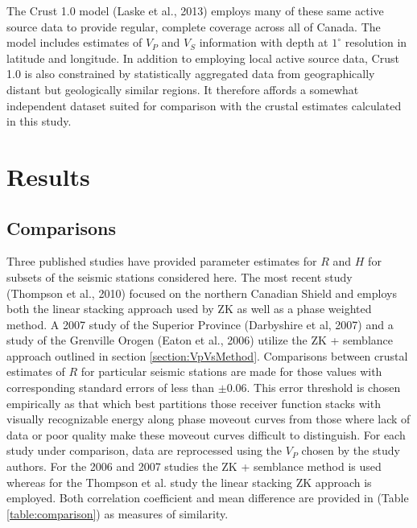 \documentclass[review]{elsarticle}
\begin{document}
The Crust 1.0 model (Laske et al., 2013) employs many of these same active source data to provide regular, complete coverage across all of Canada. The model includes estimates of $V_P$ and $V_S$ information with depth at $1^\circ$ resolution in latitude and longitude. In addition to employing local active source data, Crust 1.0 is also constrained by statistically aggregated data from geographically distant but geologically similar regions. It therefore affords a somewhat independent dataset suited for comparison with the crustal estimates calculated in this study.


\section{Results}


\subsection{Comparisons}

Three published studies have provided parameter estimates for $R$ and $H$ for subsets of the seismic stations considered here. The most recent study (Thompson et al., 2010) focused on the northern Canadian Shield and employs both the linear stacking approach used by ZK as well as a phase weighted method. A 2007 study of the Superior Province (Darbyshire et al, 2007) and a study of the Grenville Orogen (Eaton et al., 2006) utilize the ZK + semblance approach outlined in section \ref{section:VpVsMethod}.  Comparisons between crustal estimates of $R$ for particular seismic stations are made for those values with corresponding standard errors of less than $\pm$0.06. This error threshold is chosen empirically as that which best partitions those receiver function stacks with visually recognizable energy along phase moveout curves from those where lack of data or poor quality make these moveout curves difficult to distinguish. For each study under comparison, data are reprocessed using the $V_P$ chosen by the study authors. For the 2006 and 2007 studies the ZK + semblance method is used whereas for the Thompson et al. study the linear stacking ZK approach is employed. Both correlation coefficient and mean difference are provided in (Table \ref{table:comparison}) as measures of similarity.
\end{document}
